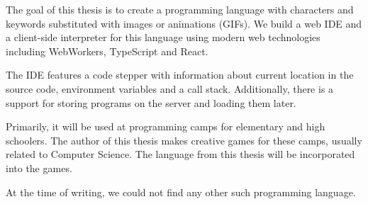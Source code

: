 \documentclass[12pt]{report}
\begin{document}
The goal of this thesis is to create a programming language with characters and keywords substituted
with images or animations (GIFs). We build a web IDE and a client-side interpreter for this language
using modern web technologies including WebWorkers, TypeScript and React.

The IDE features a code stepper with information about current location in the source
code, environment variables and a call stack. Additionally, there is a support for storing programs on the server
and loading them later.

Primarily, it will be used at programming camps for elementary and high schoolers. The author of this thesis makes
creative games for these camps, usually related to Computer Science. The language from this thesis will be incorporated
into the games.

At the time of writing, we could not find any other such programming language.
\end{document}
